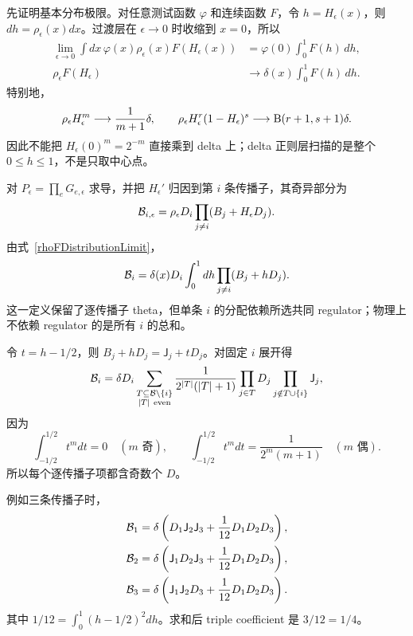 ﻿\documentclass[a4paper,11pt]{article}
\begin{document}
先证明基本分布极限。对任意测试函数 $\varphi$ 和连续函数 $F$，令 $h=H_\epsilon(x)$，则 $dh=\rho_\epsilon(x)dx$。过渡层在 $\epsilon\to0$ 时收缩到 $x=0$，所以
\begin{align}
 \lim_{\epsilon\to0}
 \int dx\,\varphi(x)\rho_\epsilon(x)F(H_\epsilon(x))
 &=\varphi(0)\int_0^1F(h)\,dh,\\
 \rho_\epsilon F(H_\epsilon)
 &\longrightarrow
 \delta(x)\int_0^1F(h)\,dh.
 \label{rhoFDistributionLimit}
\end{align}
特别地，
\begin{equation}
 \rho_\epsilon H_\epsilon^m\longrightarrow\frac{1}{m+1}\delta,
 \qquad
 \rho_\epsilon H_\epsilon^r(1-H_\epsilon)^s
 \longrightarrow {\rm B}(r+1,s+1)\delta.
 \label{rhoPowerLimits}
\end{equation}
因此不能把 $H_\epsilon(0)^m=2^{-m}$ 直接乘到 delta 上；delta 正则层扫描的是整个 $0\le h\le1$，不是只取中心点。

对 $P_\epsilon=\prod_eG_{e,\epsilon}$ 求导，并把 $H_\epsilon'$ 归因到第 $i$ 条传播子，其奇异部分为
\begin{equation}
 {\cal B}_{i,\epsilon}
 =\rho_\epsilon D_i
 \prod_{j\ne i}(B_j+H_\epsilon D_j).
\end{equation}
由式~\eqref{rhoFDistributionLimit}，
\begin{equation}
 {\cal B}_i
 =\delta(x)D_i\int_0^1dh
 \prod_{j\ne i}(B_j+hD_j).
 \label{lineResolvedBoundary}
\end{equation}
这一定义保留了逐传播子 theta，但单条 $i$ 的分配依赖所选共同 regulator；物理上不依赖 regulator 的是所有 $i$ 的总和。

令 $t=h-1/2$，则 $B_j+hD_j=\mathsf J_j+tD_j$。对固定 $i$ 展开得
\begin{equation}
 {\cal B}_i
 =\delta D_i
 \sum_{\substack{T\subseteq\mathcal B\setminus\{i\}\\|T|\ {\rm even}}}
 \frac{1}{2^{|T|}(|T|+1)}
 \prod_{j\in T}D_j
 \prod_{j\notin T\cup\{i\}}\mathsf J_j,
 \label{lineResolvedMomentExpansion}
\end{equation}
因为
\begin{equation}
 \int_{-1/2}^{1/2}t^m dt
 =0\quad(m\text{ 奇}),
 \qquad
 \int_{-1/2}^{1/2}t^m dt
 =\frac{1}{2^m(m+1)}\quad(m\text{ 偶}).
\end{equation}
所以每个逐传播子项都含奇数个 $D$。

例如三条传播子时，
\begin{align}
 {\cal B}_1&=\delta\left(D_1\mathsf J_2\mathsf J_3+\frac1{12}D_1D_2D_3\right),\\
 {\cal B}_2&=\delta\left(\mathsf J_1D_2\mathsf J_3+\frac1{12}D_1D_2D_3\right),\\
 {\cal B}_3&=\delta\left(\mathsf J_1\mathsf J_2D_3+\frac1{12}D_1D_2D_3\right).
\end{align}
其中 $1/12=\int_0^1(h-1/2)^2dh$。求和后 triple coefficient 是 $3/12=1/4$。
\end{document}

